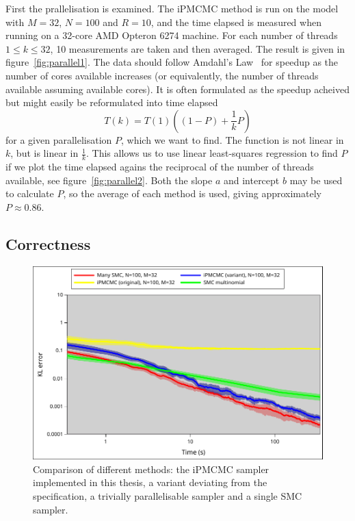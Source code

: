 First the prallelisation is examined. The iPMCMC method is run on the model with $M=32$, $N=100$ and $R=10$, and the time elapsed is measured when running on a 32-core AMD Opteron 6274 machine. For each number of threads $1 \leq k \leq 32$, 10 measurements are taken and then averaged. The result is given in figure~\ref{fig:parallel1}. The data should follow Amdahl's Law~\cite{amdahl} for speedup as the number of cores available increases (or equivalently, the number of threads available assuming available cores). It is often formulated as the speedup acheived but might easily be reformulated into time elapsed 
\begin{equation}\label{eq:amdahl}
    T(k) = T(1)\left((1-P) + \frac 1 k P\right)
\end{equation}
for a given parallelisation $P$, which we want to find. The function is not linear in $k$,  but is linear in $\frac 1 k$. This allows us to use linear least-squares regression to find $P$ if we plot the time elapsed agains the reciprocal of the number of threads available, see figure~\ref{fig:parallel2}. Both the slope $a$ and intercept $b$ may be used to calculate $P$, so the average of each method is used, giving approximately $P \approx 0.86$.

\subsection{Correctness}
\label{sub:correctness}

\begin{figure}[h]
    \centering
    \includegraphics[width=\linewidth]{figures/correctness.pdf}
    \caption{Comparison of different methods: the \mbox{iPMCMC} sampler implemented in this thesis, a variant deviating from the specification, a trivially parallelisable sampler and a single SMC sampler.}
    \label{fig:corr}
\end{figure}


